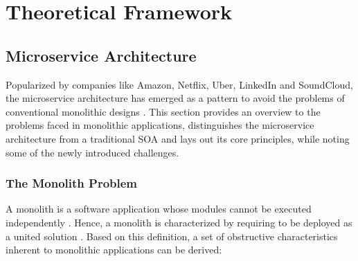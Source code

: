 
\chapter{Theoretical Framework}
\label{chp:theoretical-framework}

\section{Microservice Architecture}
\label{sec:microservice-architecture}

Popularized by companies like Amazon, Netflix, Uber, LinkedIn and SoundCloud, the microservice architecture has emerged as a pattern to avoid the problems of conventional monolithic designs \cite[p.~847]{singh2017container} \cite[p.~584]{villamizar2015evaluating}. This section provides an overview to the problems faced in monolithic applications, distinguishes the microservice architecture from a traditional \acl{SOA} and lays out its core principles, while noting some of the newly introduced challenges.


\subsection{The Monolith Problem}
\label{sec:monolith-problem}

A monolith is a software application whose modules cannot be executed independently \cite[p.~1]{dragoni2017microservices}. Hence, a monolith is characterized by requiring to be deployed as a united solution \cite[p.~24]{dmitry2014micro}. Based on this definition, a set of obstructive characteristics inherent to monolithic applications can be derived:

